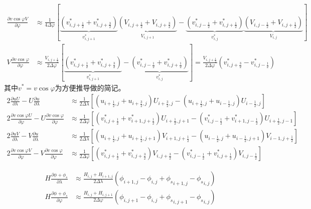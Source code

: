 \documentclass{ctexart}
\begin{document}
\begin{align}
  \frac{\partial v \cos{\varphi} V}{\partial \varphi} & \approx \frac{1}{4 \Delta{\varphi}} \left[ \underbrace{\left( v_{i,j+\frac{1}{2}}^* + v_{i,j+\frac{3}{2}}^* \right)}_{v_{i,j+1}^*} \underbrace{\left( V_{i,j+\frac{1}{2}} + V_{i,j+\frac{3}{2}} \right)}_{V_{i,j+1}} - \underbrace{\left( v_{i,j-\frac{1}{2}}^* + v_{i,j+\frac{1}{2}}^* \right)}_{v_{i,j}^*} \underbrace{\left( V_{i,j-\frac{1}{2}} + V_{i,j+\frac{1}{2}} \right)}_{V_{i,j}} \right] \nonumber \\
  V \frac{\partial v \cos{\varphi}}{\partial \varphi} & \approx \frac{V_{i,j+\frac{1}{2}}}{2 \Delta{\varphi}} \left[ \underbrace{\left( v_{i,j+\frac{1}{2}}^* + v_{i,j+\frac{3}{2}}^* \right)}_{v_{i,j+1}^*} - \underbrace{\left( v_{i,j-\frac{1}{2}}^* + v_{i,j+\frac{1}{2}}^* \right)}_{v_{i,j}^*} \right] = \frac{V_{i,j+\frac{1}{2}}}{2 \Delta{\varphi}} \left( v_{i,j+\frac{3}{2}}^* - v_{i,j-\frac{1}{2}}^* \right) \nonumber
\end{align}
其中$v^* = v \cos{\varphi}$为方便推导做的简记。
\begin{align}
  2 \frac{\partial u U}{\partial \lambda} - U \frac{\partial u}{\partial \lambda} & \approx \frac{1}{2 \Delta{\lambda}} \left[ \left( u_{i+\frac{1}{2},j} + u_{i+\frac{3}{2},j} \right) U_{i+\frac{3}{2},j} - \left( u_{i+\frac{1}{2},j} + u_{i-\frac{1}{2},j} \right) U_{i-\frac{1}{2},j} \right] \\
  2 \frac{\partial v \cos{\varphi} U}{\partial \varphi} - U \frac{\partial v \cos{\varphi}}{\partial \varphi} & \approx \frac{1}{2 \Delta{\varphi}} \left[ \left( v_{i,j+\frac{1}{2}}^* + v_{i+1,j+\frac{1}{2}}^* \right) U_{i+\frac{1}{2},j+1} - \left( v_{i,j-\frac{1}{2}}^* + v_{i+1,j-\frac{1}{2}}^* \right) U_{i+\frac{1}{2},j-1} \right] \\
  2 \frac{\partial u V}{\partial \lambda} - V \frac{\partial u}{\partial \lambda} & \approx \frac{1}{2 \Delta{\lambda}} \left[ \left( u_{i+\frac{1}{2},j} + u_{i+\frac{1}{2},j+1} \right) V_{i+1,j+\frac{1}{2}} - \left( u_{i-\frac{1}{2},j} + u_{i-\frac{1}{2},j+1} \right) V_{i-1,j+\frac{1}{2}} \right] \\
  2 \frac{\partial v \cos{\varphi} V}{\partial \varphi} - V \frac{\partial v \cos{\varphi}}{\partial \varphi} & \approx \frac{1}{2 \Delta{\varphi}} \left[ \left( v_{i,j+\frac{1}{2}}^* + v_{i,j+\frac{3}{2}}^* \right) V_{i,j+\frac{3}{2}} - \left( v_{i,j-\frac{1}{2}}^* + v_{i,j+\frac{1}{2}}^* \right) V_{i,j-\frac{1}{2}} \right]
\end{align}

\begin{align}
  H \frac{\partial \phi + \phi_s}{\partial \lambda} & \approx \frac{H_{i,j} + H_{i+1,j}}{2 \Delta{\lambda}} \left( \phi_{i+1,j} - \phi_{i,j} + {\phi_s}_{i+1,j} - {\phi_s}_{i,j} \right) \\
  H \frac{\partial \phi + \phi_s}{\partial \varphi} & \approx \frac{H_{i,j} + H_{i,j+1}}{2 \Delta{\varphi}} \left( \phi_{i,j+1} - \phi_{i,j} + {\phi_s}_{i,j+1} - {\phi_s}_{i,j} \right)
\end{align}
\end{document}
